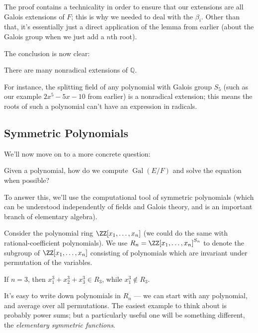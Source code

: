 \begin{note}
The proof contains a technicality in order to ensure that our extensions are all Galois extensions of $F$; this is why we needed to deal with the $\beta_i$. Other than that, it's essentially just a direct application of the lemma from earlier (about the Galois group when we just add a $n$th root). 
\end{note}

The conclusion is now clear: 

\begin{corollary}
    There are many nonradical extensions of $\mathbb{Q}$. 
\end{corollary}

For instance, the splitting field of any polynomial with Galois group $S_5$ (such as our example $2x^5 - 5x - 10$ from earlier) is a nonradical extension; this means the roots of such a polynomial can't have an expression in radicals. 

\subsection{Symmetric Polynomials}

We'll now move on to a more concrete question:

\begin{qq}
    Given a polynomial, how do we compute $\operatorname{Gal}(E/F)$ and solve the equation when possible?
\end{qq}

To answer this, we'll use the computational tool of symmetric polynomials (which can be understood independently of fields and Galois theory, and is an important branch of elementary algebra). 

Consider the polynomial ring $\ZZ[x_1, \ldots, x_n]$ (we could do the same with rational-coefficient polynomials). We use $R_n = \ZZ[x_1, \ldots, x_n]^{S_n}$ to denote the subgroup of $\ZZ[x_1, \ldots, x_n]$ consisting of polynomials which are invariant under permutation of the variables. 

\begin{example}
    If $n = 3$, then $x_1^3 + x_2^3 + x_3^3 \in R_3$, while $x_1^3 \not\in R_3$. 
\end{example}

It's easy to write down polynomials in $R_n$ --- we can start with any polynomial, and average over all permutations. The easiest example to think about is probably power sums; but a particularly useful one will be something different, the \emph{elementary symmetric functions}. 

